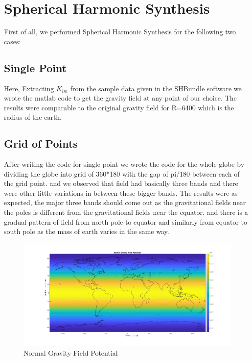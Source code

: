 \documentclass[a4paper,12pt]{report}
\begin{document}
\chapter{Spherical Harmonic Synthesis}
First of all, we performed Spherical Harmonic Synthesis for the following two cases:
\section{Single Point}
Here, Extracting $K_{lm}$ from the sample data given in the SHBundle software we wrote the matlab code to get the gravity field at any point of our choice.
The results were comparable to the original gravity field for R=6400 which is the radius of the earth.

\section{Grid of Points}

After writing the code for single point we wrote the code for the whole globe by dividing the globe into grid of 360*180 with the gap of pi/180 between each of the grid point.
and we observed that field had basically three bands and there were other little variations in between these bigger bands. The results were as expected, the major three bands should come out as the gravitational fields near the poles is different from the gravitational fields near the equator. and there is a gradual pattern of field from north pole to equator and similarly from equator to south pole as the mass of earth varies in the same way.

\begin{figure}[!h]
    \centering
    \includegraphics[width=0.96\linewidth]{Normal_grid}
    \caption{Normal Gravity Field Potential}
    
\end{figure}
\end{document}
